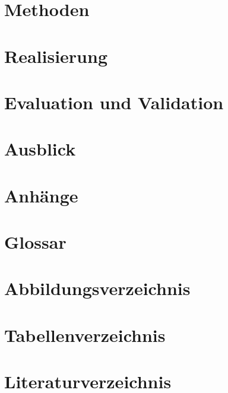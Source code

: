 \documentclass[a4paper]{article}
\begin{document}

\section{Methoden}


\section{Realisierung}


\section{Evaluation und Validation}


\section{Ausblick}


\newpage

\section{Anhänge}


\section{Glossar}



\section{Abbildungsverzeichnis}
\listoffigures

\section{Tabellenverzeichnis}
\listoftables

\section{Literaturverzeichnis}
\printbibliography
\end{document}
